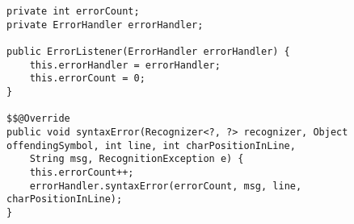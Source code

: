 \begin{lstlisting}[caption={Start of the ErrorListener class}, label={eh01}]
private int errorCount;
private ErrorHandler errorHandler;

public ErrorListener(ErrorHandler errorHandler) {
    this.errorHandler = errorHandler;
    this.errorCount = 0;
}

$$@Override
public void syntaxError(Recognizer<?, ?> recognizer, Object offendingSymbol, int line, int charPositionInLine,
    String msg, RecognitionException e) {
    this.errorCount++;
    errorHandler.syntaxError(errorCount, msg, line, charPositionInLine);
}
\end{lstlisting}